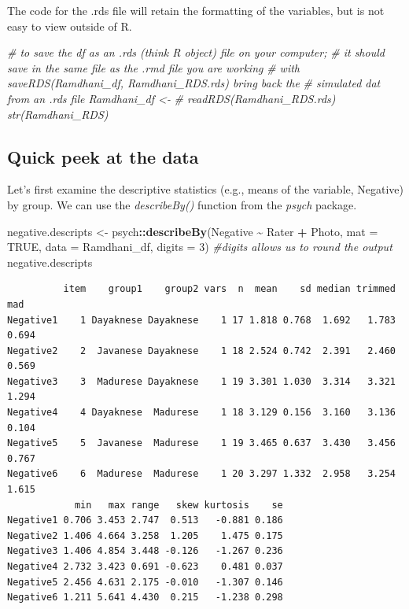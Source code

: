 \documentclass[
  11pt,
]{book}
\newenvironment{Shaded}{\begin{snugshade}}{\end{snugshade}}
\newcommand{\AttributeTok}[1]{\textcolor[rgb]{0.27,0.27,0.27}{#1}}
\newcommand{\CommentTok}[1]{\textcolor[rgb]{0.37,0.37,0.37}{\textit{#1}}}
\newcommand{\ConstantTok}[1]{\textcolor[rgb]{0.37,0.37,0.37}{#1}}
\newcommand{\DecValTok}[1]{\textcolor[rgb]{0.06,0.06,0.06}{#1}}
\newcommand{\FunctionTok}[1]{\textcolor[rgb]{0.27,0.27,0.27}{\textbf{#1}}}
\newcommand{\NormalTok}[1]{#1}
\newcommand{\OtherTok}[1]{\textcolor[rgb]{0.37,0.37,0.37}{#1}}
\newcommand{\SpecialCharTok}[1]{\textcolor[rgb]{0.43,0.43,0.43}{\textbf{#1}}}
\begin{document}
The code for the .rds file will retain the formatting of the variables, but is not easy to view outside of R.

\begin{Shaded}
\begin{Highlighting}[]
\CommentTok{\# to save the df as an .rds (think \textquotesingle{}R object\textquotesingle{}) file on your computer;}
\CommentTok{\# it should save in the same file as the .rmd file you are working}
\CommentTok{\# with saveRDS(Ramdhani\_df, \textquotesingle{}Ramdhani\_RDS.rds\textquotesingle{}) bring back the}
\CommentTok{\# simulated dat from an .rds file Ramdhani\_df \textless{}{-}}
\CommentTok{\# readRDS(\textquotesingle{}Ramdhani\_RDS.rds\textquotesingle{}) str(Ramdhani\_RDS)}
\end{Highlighting}
\end{Shaded}

\hypertarget{quick-peek-at-the-data-4}{%
\subsection{Quick peek at the data}\label{quick-peek-at-the-data-4}}

Let's first examine the descriptive statistics (e.g., means of the variable, Negative) by group. We can use the \emph{describeBy()} function from the \emph{psych} package.

\begin{Shaded}
\begin{Highlighting}[]
\NormalTok{negative.descripts }\OtherTok{\textless{}{-}}\NormalTok{ psych}\SpecialCharTok{::}\FunctionTok{describeBy}\NormalTok{(Negative }\SpecialCharTok{\textasciitilde{}}\NormalTok{ Rater }\SpecialCharTok{+}\NormalTok{ Photo, }\AttributeTok{mat =} \ConstantTok{TRUE}\NormalTok{,}
    \AttributeTok{data =}\NormalTok{ Ramdhani\_df, }\AttributeTok{digits =} \DecValTok{3}\NormalTok{)  }\CommentTok{\#digits allows us to round the output}
\NormalTok{negative.descripts}
\end{Highlighting}
\end{Shaded}

\begin{verbatim}
          item    group1    group2 vars  n  mean    sd median trimmed   mad
Negative1    1 Dayaknese Dayaknese    1 17 1.818 0.768  1.692   1.783 0.694
Negative2    2  Javanese Dayaknese    1 18 2.524 0.742  2.391   2.460 0.569
Negative3    3  Madurese Dayaknese    1 19 3.301 1.030  3.314   3.321 1.294
Negative4    4 Dayaknese  Madurese    1 18 3.129 0.156  3.160   3.136 0.104
Negative5    5  Javanese  Madurese    1 19 3.465 0.637  3.430   3.456 0.767
Negative6    6  Madurese  Madurese    1 20 3.297 1.332  2.958   3.254 1.615
            min   max range   skew kurtosis    se
Negative1 0.706 3.453 2.747  0.513   -0.881 0.186
Negative2 1.406 4.664 3.258  1.205    1.475 0.175
Negative3 1.406 4.854 3.448 -0.126   -1.267 0.236
Negative4 2.732 3.423 0.691 -0.623    0.481 0.037
Negative5 2.456 4.631 2.175 -0.010   -1.307 0.146
Negative6 1.211 5.641 4.430  0.215   -1.238 0.298
\end{verbatim}
\end{document}
